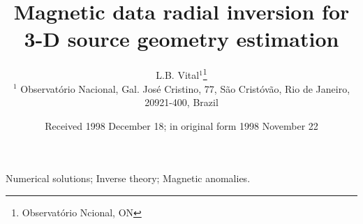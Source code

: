 \documentclass[extra,mreferee]{gji}
\title[Geophys.\ J.\ Int.: Magnetic radial inversion]
  {Magnetic data radial inversion for 3-D source geometry estimation}
\author[L.B. Vital, V.C. Oliveira Jr., V.C.F. Barbosa]
  {L.B. Vital$^1$\thanks{Observatório Ncional, ON}\\
  $^1$ Observat{\'o}rio Nacional, Gal. Jos{\'e} Cristino, 77, São Crist{\'o}v{\~a}o,
  Rio de Janeiro, 20921-400, Brazil
  }
\date{Received 1998 December 18; in original form 1998 November 22}
\begin{document}
\label{firstpage}

\maketitle



\begin{keywords}
 Numerical solutions; Inverse theory; Magnetic anomalies.
\end{keywords}











\begin{acknowledgments}
\end{acknowledgments}






\appendix

\label{lastpage}
\end{document}
